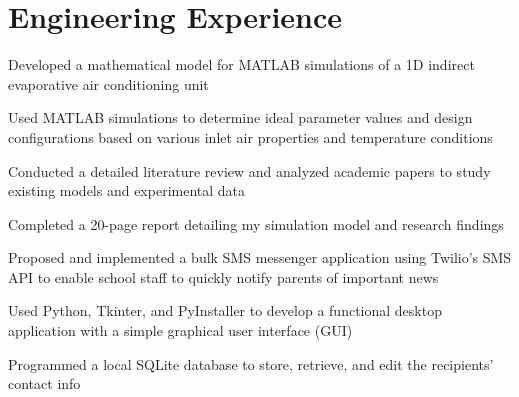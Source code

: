 \begin{minipage}[t]{0.66\textwidth} %


\section{Engineering Experience}

\vspace{\topsep} %
\begin{tightitemize}
\item Developed a mathematical model for MATLAB simulations of a 1D indirect evaporative air conditioning unit
\item Used MATLAB simulations to determine ideal parameter values and design configurations based on various inlet air properties and temperature conditions
\item Conducted a detailed literature review and analyzed academic papers to study existing models and experimental data
\item Completed a 20-page report detailing my simulation model and research findings
\end{tightitemize}

\sectionspace %


\begin{tightitemize}
\item Proposed and implemented a bulk SMS messenger application using Twilio's SMS API to enable school staff to quickly notify parents of important news
\item Used Python, Tkinter, and PyInstaller to develop a functional desktop application with a simple graphical user interface (GUI)
\item Programmed a local SQLite database to store, retrieve, and edit the recipients' contact info
\end{tightitemize}
\sectionspace %


\end{minipage}
